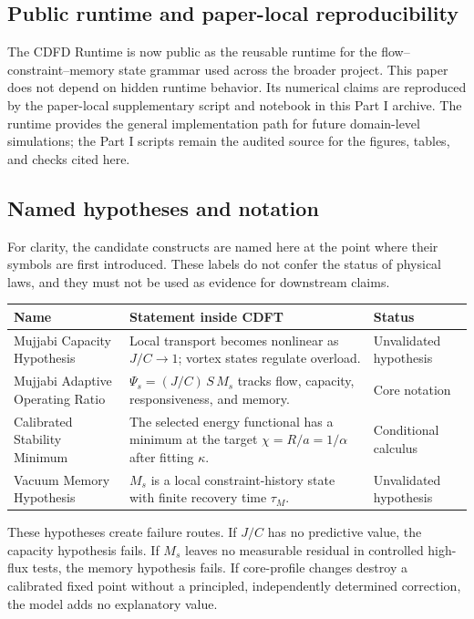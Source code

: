 \documentclass[11pt]{article}
\begin{document}
\subsection{Public runtime and paper-local reproducibility}

The CDFD Runtime is now public as the reusable runtime for the
flow--constraint--memory state grammar used across the broader project. This
paper does not depend on hidden runtime behavior. Its numerical claims are
reproduced by the paper-local supplementary script and notebook in this Part I
archive. The runtime provides the general implementation path for future
domain-level simulations; the Part I scripts remain the audited source for the
figures, tables, and checks cited here.

\subsection{Named hypotheses and notation}

For clarity, the candidate constructs are named here at the point where their
symbols are first introduced. These labels do not confer the status of physical
laws, and they must not be used as evidence for downstream claims.

\begin{center}
\small
\begin{tabular}{p{}p{}p{}}
\toprule
\textbf{Name} & \textbf{Statement inside CDFT} & \textbf{Status}\\
\midrule
Mujjabi Capacity Hypothesis & Local transport becomes nonlinear as $J/C\rightarrow1$; vortex states regulate overload. & Unvalidated hypothesis\\
Mujjabi Adaptive Operating Ratio & $\Psi_s=(J/C)\,S\,M_s$ tracks flow, capacity, responsiveness, and memory. & Core notation\\
Calibrated Stability Minimum & The selected energy functional has a minimum at the target $\chi=R/a=1/\alpha$ after fitting $\kappa$. & Conditional calculus\\
Vacuum Memory Hypothesis & $M_s$ is a local constraint-history state with finite recovery time $\tau_M$. & Unvalidated hypothesis\\
\bottomrule
\end{tabular}
\end{center}

These hypotheses create failure routes. If $J/C$ has no predictive value, the
capacity hypothesis fails. If $M_s$ leaves no measurable residual in controlled
high-flux tests, the memory hypothesis fails. If core-profile changes destroy a
calibrated fixed point without a principled, independently determined
correction, the model adds no explanatory value.
\end{document}
